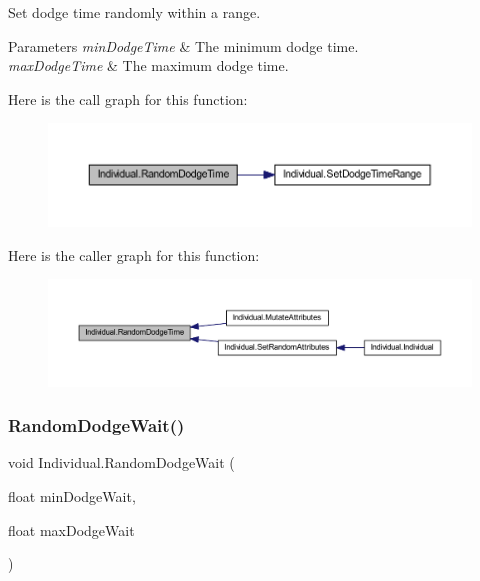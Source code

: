 Set dodge time randomly within a range. 


\begin{DoxyParams}{Parameters}
{\em min\+Dodge\+Time} & The minimum dodge time.\\
\hline
{\em max\+Dodge\+Time} & The maximum dodge time.\\
\hline
\end{DoxyParams}
Here is the call graph for this function\+:\nopagebreak
\begin{figure}[H]
\begin{center}
\leavevmode
\includegraphics[width=350pt]{class_individual_a108e7c67d55c334bcc885e8dc5bb740b_cgraph}
\end{center}
\end{figure}
Here is the caller graph for this function\+:\nopagebreak
\begin{figure}[H]
\begin{center}
\leavevmode
\includegraphics[width=350pt]{class_individual_a108e7c67d55c334bcc885e8dc5bb740b_icgraph}
\end{center}
\end{figure}
\mbox{\label{class_individual_a1ac91351958ff89363dac0c16612f07d}} 
\subsubsection{\texorpdfstring{Random\+Dodge\+Wait()}{RandomDodgeWait()}}
{\footnotesize\ttfamily void Individual.\+Random\+Dodge\+Wait (\begin{DoxyParamCaption}\item[{float}]{min\+Dodge\+Wait,  }\item[{float}]{max\+Dodge\+Wait }\end{DoxyParamCaption})}



